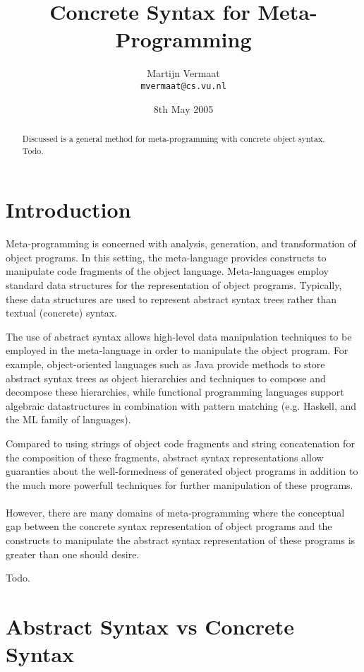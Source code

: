 \documentclass[a4paper,11pt]{article}
\title{Concrete Syntax for Meta-Programming}
\author{Martijn Vermaat\\
\texttt{mvermaat@cs.vu.nl}}
\date{8th May 2005}
\begin{document}
\maketitle


\begin{abstract}
Discussed is a general method for meta-programming with concrete object
syntax. Todo.
\end{abstract}


\section{Introduction}

Meta-programming is concerned with analysis, generation, and transformation
of object programs. In this setting, the meta-language provides constructs
to manipulate code fragments of the object language. Meta-languages employ
standard data structures for the representation of object programs. Typically,
these data structures are used to represent abstract syntax trees rather
than textual (concrete) syntax.

The use of abstract syntax allows high-level data manipulation techniques
to be employed in the meta-language in order to manipulate the object program.
For example, object-oriented languages such as Java provide methods to store
abstract syntax trees as object hierarchies and techniques to compose and
decompose these hierarchies, while functional programming languages support
algebraic datastructures in combination with pattern matching (e.g. Haskell,
and the ML family of languages).

Compared to using strings of object code fragments and string concatenation
for the composition of these fragments, abstract syntax representations allow
guaranties about the well-formedness of generated object programs in addition
to the much more powerfull techniques for further manipulation of these
programs.

\paragraph{}

However, there are many domains of meta-programming where the conceptual gap
between the concrete syntax representation of object programs and the constructs
to manipulate the abstract syntax representation of these programs is greater
than one should desire.


Todo.


\section{Abstract Syntax vs Concrete Syntax}
\end{document}
